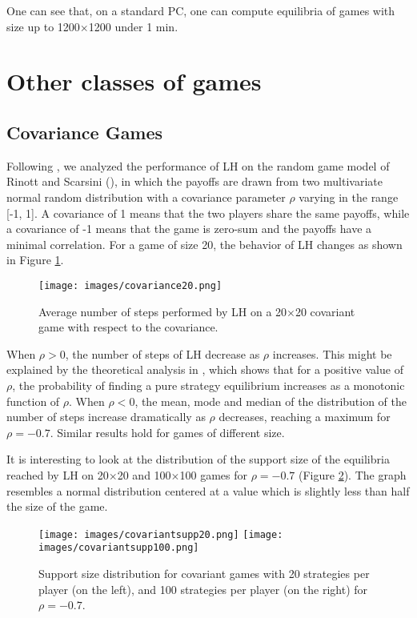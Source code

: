 \documentclass[11pt]{article}
\begin{document}
One can see that, on a standard PC, one can compute equilibria of games with size 
up to 1200$\times$1200 under 1 min. 

\section{Other classes of games}

\subsection{Covariance Games}
Following \cite{gamut}, we analyzed the performance of LH on the random game model of Rinott
and Scarsini (\cite{covariance}), in which the payoffs are drawn
from two multivariate normal random distribution with a covariance
parameter \emph{$\rho$} varying in the range [-1, 1]. A covariance
of 1 means that the two players share the same payoffs, while a
covariance of -1 means that the game is zero-sum and the payoffs
have a minimal correlation. For a game of size 20, the behavior of
LH changes as shown in Figure \ref{covariance20}.

\begin{figure}[h]
\centering
\texttt{[image: images/covariance20.png]}
\caption{Average number of steps performed by LH on a 20$\times$20 covariant
game with respect to the covariance.} \label{covariance20}
\end{figure}

When $\rho >0$, the number of steps of LH decrease as $\rho$
increases. This might be explained by the theoretical analysis in
\cite{covariance}, which shows that for a positive value of $\rho$,
the probability of finding a pure strategy equilibrium increases as
a monotonic function of $\rho$. When $\rho < 0$, the
mean, mode and median of the distribution of the number of steps
increase dramatically as $\rho$ decreases, reaching a maximum for
$\rho = -0.7$. Similar
results hold for games of different size.

It is interesting to look at the distribution of the support size of
the equilibria reached by LH on 20$\times$20 and 100$\times$100 games
for $\rho =
 -0.7$ (Figure \ref{covsup}). The graph resembles a normal distribution
centered at a value which is slightly less than half the size of the game.

\begin{figure}[h]
\centering
\texttt{[image: images/covariantsupp20.png]}
\texttt{[image: images/covariantsupp100.png]}
\caption{Support size distribution for covariant games with 20 strategies per
player (on the left), and 100 strategies per player (on the right) for
$\rho = -0.7$.}
\label{covsup}
\end{figure}
\end{document}
